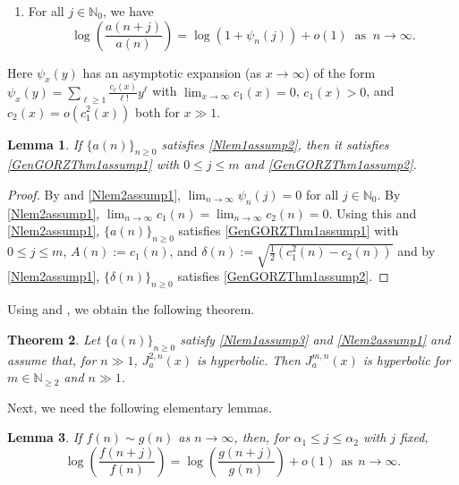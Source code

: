 \documentclass[11pt,reqno,a4paper]{amsart}
\renewcommand{\a}{\alpha}
\renewcommand{\d}{{\delta}}
\renewcommand{\(}{\left\(}
\renewcommand{\)}{\right\)}
\numberwithin{equation}{section}
\theoremstyle{plain}
\newtheorem{theorem}{Theorem}[section]
\newtheorem{lemma}[theorem]{Lemma}
\theoremstyle{definition} %
\numberwithin{equation}{section}
\begin{document}
 
\begin{enumerate}[label=(C\arabic*), start=15]
\item \label{Nlem2assump1} For all $j\in \mathbb{N}_0$, we have 
\begin{equation*}%
\log\left(\frac{a(n+j)}{a(n)}\right)=\log\left(1+\psi_n(j)\right)+o(1)%
\ \text{ as }\ n\to \infty.
\end{equation*}
\end{enumerate}
Here $\psi_x(y)$ has an asymptotic expansion (as $x\to \infty$) of the form $\psi_x(y)=\sum_{\ell\ge 1}\frac{c_{\ell}(x)}{\ell!}y^{\ell}$ with $\lim_{x\to \infty}c_1(x)=0$, $c_1(x)>0$, and $c_2(x)=o(c^2_1(x))$ both for $x\!\gg\!1$.
\begin{lemma}\label{Nlem2}
If $\{a(n)\}_{n\ge 0}$ satisfies {\rm{\ref{Nlem1assump2}}}\textendash{\rm{\ref{Nlem2assump1}}}, then it satisfies {\rm{\ref{GenGORZThm1assump1}}} with $0\le j\le m$ and {\rm{\ref{GenGORZThm1assump2}}}.
\end{lemma}
\begin{proof}
 By  and \ref{Nlem2assump1}, $\lim_{n\to \infty}\psi_n(j)=0$ for all $j\in \mathbb{N}_0$. By \ref{Nlem2assump1}, $\lim_{n\to \infty}c_1(n)=\lim_{n\to \infty}c_2(n)=0$.  Using this and \ref{Nlem2assump1}, $\{a(n)\}_{n\ge 0}$ satisfies \ref{GenGORZThm1assump1} with $0\le j\le m$, 
$A(n):=c_1(n)$, and $\d(n):=\sqrt{\frac 12(c^2_1(n)-c_2(n))}$ and by \ref{Nlem2assump1}, $\{\d(n)\}_{n\ge 0}$ satisfies \ref{GenGORZThm1assump2}.\qedhere  
\end{proof}

Using  and , we obtain the following theorem. 

\begin{theorem}\label{HypEquivthm}
Let $\{a(n)\}_{n\ge 0}$ satisfy {\rm{\ref{Nlem1assump3}}} and  {\rm{\ref{Nlem2assump1}}} and assume that, %
 for $n\gg1$,
$J^{2,n}_a(x)$ is hyperbolic. Then $J^{m,n}_a(x)$ is hyperbolic for $m\in \mathbb{N}_{\ge 2}$ and $n\!\gg\!1$.
\end{theorem}

 






 Next, we need the following elementary lemmas. 
 

\begin{lemma}\label{Fact1}
	If $f(n)\sim g(n)$ as $n\to \infty$, then, for $\a_1\le j\le \a_2$ %
	 with $j$ fixed, 
	\[
	\log\left(\frac{f(n+j)}{f(n)}\right)=\log\left(\frac{g(n+j)}{g(n)}\right)+o(1)\ \ \text{as}\ \ n\to\infty.
	\]
\end{lemma}
\end{document}
